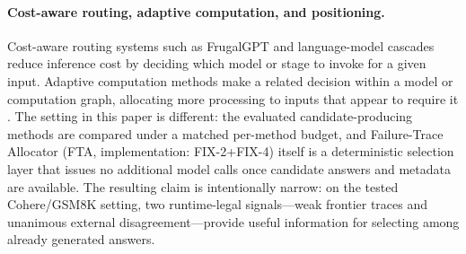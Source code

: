 \paragraph{Cost-aware routing, adaptive computation, and positioning.}
Cost-aware routing systems such as FrugalGPT \citep{chen2023frugalgpt} and language-model cascades \citep{dohan2022language} reduce inference cost by deciding which model or stage to invoke for a given input.
Adaptive computation methods make a related decision within a model or computation graph, allocating more processing to inputs that appear to require it \citep{graves2016adaptive}.
The setting in this paper is different: the evaluated candidate-producing methods are compared under a matched per-method budget, and Failure-Trace Allocator (FTA, implementation: FIX-2+FIX-4) itself is a deterministic selection layer that issues no additional model calls once candidate answers and metadata are available.
The resulting claim is intentionally narrow: on the tested Cohere/GSM8K setting, two runtime-legal signals---weak frontier traces and unanimous external disagreement---provide useful information for selecting among already generated answers.
